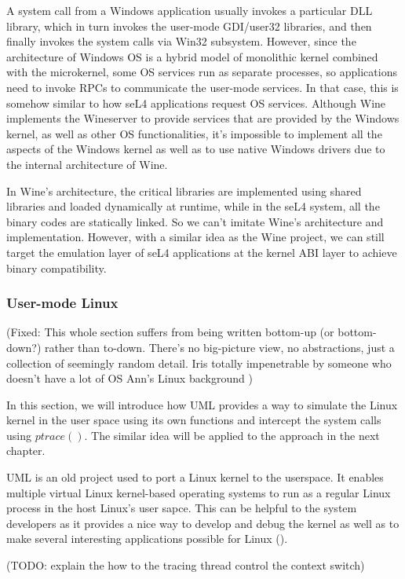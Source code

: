 A system call from a Windows application usually invokes a particular DLL library, which in turn invokes the user-mode GDI/user32 libraries, and then finally invokes the system calls via Win32 subsystem. However, since the architecture of Windows OS is a hybrid model of monolithic kernel combined with the microkernel, some OS services run as separate processes, so applications need to invoke RPCs to communicate the user-mode services. In that case, this is somehow similar to how seL4 applications request OS services. Although Wine implements the Wineserver to provide services that are provided by the Windows kernel, as well as other OS functionalities, it's impossible to implement all the aspects of the Windows kernel as well as to use native Windows drivers due to the internal architecture of Wine. 

In Wine's architecture, the critical libraries are implemented using shared libraries and loaded dynamically at runtime, while in the seL4 system, all the binary codes are statically linked. So we can't imitate Wine's architecture and implementation. However, with a similar idea as the Wine project, we can still target the emulation layer of seL4 applications at the kernel ABI layer to achieve binary compatibility.

\subsubsection{User-mode Linux}

(Fixed: This whole section suffers from being written bottom-up (or bottom-down?) rather than to-down. There's no big-picture view, no abstractions, just a collection of seemingly random detail. Iris totally impenetrable by someone who doesn't have a lot of OS Ann's Linux background )

In this section, we will introduce how UML provides a way to simulate the Linux kernel in the user space using its own functions and intercept the system calls using $ptrace()$. The similar idea will be applied to the approach in the next chapter.

UML is an old project used to port a Linux kernel to the userspace. It enables multiple virtual Linux kernel-based operating systems to run as a regular Linux process in the host Linux's user sapce. This can be helpful to the system developers as it provides a nice way to develop and debug the kernel as well as to make several interesting applications possible for Linux (\cite{JD06}). 

(TODO: explain the how to the tracing thread control the context switch)

